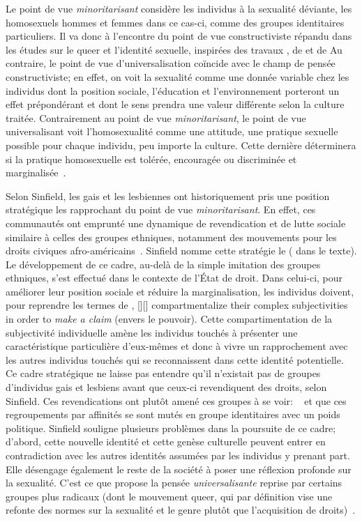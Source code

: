 Le point de vue \emph{minoritarisant} considère les individus à la sexualité déviante, les homosexuels hommes et femmes dans ce cas-ci, comme des groupes identitaires particuliers.
Il va donc à l'encontre du point de vue constructiviste répandu dans les études sur le queer et l'identité sexuelle, inspirées des travaux \citet{Foucault2011}, de \citet{Rubin2010} et de \citet{Butler2007}
Au contraire, le point de vue d'universalisation coïncide avec le champ de pensée constructiviste; en effet, on voit la sexualité comme une donnée variable chez les individus dont la position sociale, l'éducation et l'environnement porteront un effet prépondérant et dont le sens prendra une valeur différente selon la culture traitée.
Contrairement au point de vue \emph{minoritarisant}, le point de vue universalisant voit l'homosexualité comme une attitude, une pratique sexuelle possible pour chaque individu, peu importe la culture.
Cette dernière déterminera si la pratique homosexuelle est tolérée, encouragée ou discriminée et marginalisée~\citep[271]{Sinfield1996}.

Selon Sinfield, les gais et les lesbiennes ont historiquement pris une position stratégique les rapprochant du point de vue \emph{minoritarisant}.
En effet, ces communautés ont emprunté une dynamique de revendication et de lutte sociale similaire à celles des groupes ethniques, notamment des mouvements pour les droits civiques afro-américains~\citep[271]{Sinfield1996}.
Sinfield nomme cette stratégie le  ( dans le texte).
Le développement de ce cadre, au-delà de la simple imitation des groupes ethniques, s'est effectué dans le contexte de l'État de droit.
Dans celui-ci, pour améliorer leur position sociale et réduire la marginalisation, les individus doivent, pour reprendre les termes de \citet{Sinfield1996}, [{\citeyear[272]{Sinfield1996}}][]{\textelp{} compartmentalize their complex subjectivities in order to \emph{make a claim} (envers le pouvoir)}.
Cette compartimentation de la subjectivité individuelle amène les individus touchés à présenter une caractéristique particulière d'eux-mêmes et donc à vivre un rapprochement avec les autres individus touchés qui se reconnaissent dans cette identité potentielle.
Ce cadre stratégique ne laisse pas entendre qu'il n'existait pas de groupes d'individus gais et lesbiens avant que ceux-ci revendiquent des droits, selon Sinfield.
Ces revendications ont plutôt amené ces groupes à se voir:  ~\citep[272]{Sinfield1996} et que ces regroupements par affinités se sont mutés en groupe identitaires avec un poids politique.
Sinfield souligne plusieurs problèmes dans la poursuite de ce cadre; d'abord, cette nouvelle identité et cette genèse culturelle peuvent entrer en contradiction avec les autres identités assumées par les individus y prenant part.
Elle désengage également le reste de la société à poser une réflexion profonde sur la sexualité.
C'est ce que propose la pensée \emph{universalisante} reprise par certains groupes plus radicaux (dont le mouvement queer, qui par définition vise une refonte des normes sur la sexualité et le genre plutôt que l'acquisition de droits)~\citep[273]{Sinfield1996}.

